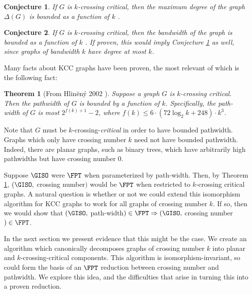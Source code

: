 \documentclass[11pt]{report}
\newtheorem{thm}{Theorem}
\newtheorem{conj}{Conjecture}
\begin{document}
\begin{conj}  If $G$ is $k$-crossing critical, then the maximum degree of the graph $\Delta(G)$ is bounded as a function of $k$  \cite{RichterSalazar08}.
\label{conj:bounded_cn_bounded_deg}
\end{conj}

\begin{conj}
If $G$ is $k$-crossing critical, then the bandwidth of the graph is bounded as a function of $k$ \cite{RichterSalazar08}. If proven, this would imply Conjecture \ref{conj:bounded_cn_bounded_deg} as well, since graphs of bandwidth $k$ have degree at most $k$.
\end{conj}



Many facts about KCC graphs have been proven, the most relevant of which is the following fact: 

\begin{thm} [From Hlin\u{e}n\'{y} 2002 \cite{Hlineny02}] Suppose a graph $G$ is $k$-crossing critical. Then the pathwidth of $G$ is bounded by a function of $k$. Specifically, the path-width of $G$ is most $2^{f(k)+1}-2$, where $f(k) \leq 6 · (72 \log_{2} k + 248) · k^3$.
\label{kcc_implies_pw}
\end{thm}

Note that $G$ must be $k$-crossing-\emph{critical} in order to have bounded pathwidth. Graphs which only have crossing number $k$ need not have bounded pathwidth. Indeed, there are planar graphs, such as binary trees, which have arbitrarily high pathwidths but have crossing number 0. 

Suppose $\GISO$ were $\FPT$ when parameterized by path-width. Then, by Theorem \ref{kcc_implies_pw},
 $(\GISO,$ crossing number$)$ would be $\FPT$ when restricted to $k$-crossing critical graphs. A natural question is whether or not we could extend this isomorphism algorithm for KCC graphs to work for all graphs of crossing number $k$. If so, then we would show that $(\GISO,$ path-width$)\in\FPT\Rightarrow (\GISO, $ crossing number$)\in\FPT$.

In the next section we present evidence that this might be the case. We create an algorithm which canonically decomposes graphs of crossing number $k$ into planar and $k$-crossing-critical components. This algorithm is isomorphism-invariant, so could form the basis of an $\FPT$ reduction between crossing number and pathwidth. We explore this idea, and the difficulties that arise in turning this into a proven reduction.
\end{document}
